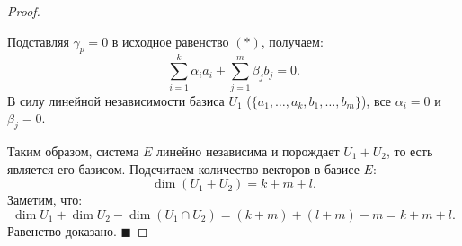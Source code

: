 \begin{proof}
\begin{itemize}
    Подставляя $\gamma_p = 0$ в исходное равенство $(*)$, получаем:
    \[
    \sum_{i=1}^k \alpha_i a_i + \sum_{j=1}^m \beta_j b_j = 0.
    \]
    В силу линейной независимости базиса $U_1$ ($\{a_1, \dots, a_k, b_1, \dots, b_m\}$), все $\alpha_i = 0$ и $\beta_j = 0$.
\end{itemize}

Таким образом, система $E$ линейно независима и порождает $U_1 + U_2$, то есть является его базисом. 
Подсчитаем количество векторов в базисе $E$:
\[
\dim(U_1 + U_2) = k + m + l.
\]
Заметим, что:
\[
\dim U_1 + \dim U_2 - \dim(U_1 \cap U_2) = (k + m) + (l + m) - m = k + m + l.
\]
Равенство доказано.
\hfill$\blacksquare$
\end{proof}
